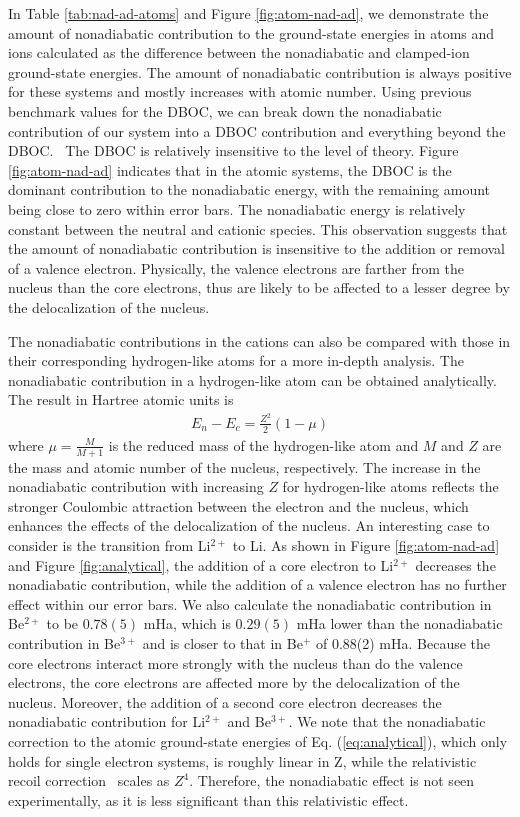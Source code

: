 In Table \ref{tab:nad-ad-atoms} and Figure \ref{fig:atom-nad-ad}, we demonstrate the amount of nonadiabatic contribution to the ground-state energies in atoms and ions calculated as the difference between the nonadiabatic and clamped-ion ground-state energies. The amount of nonadiabatic contribution is always positive for these systems and mostly increases with atomic number. Using previous benchmark values for the DBOC, we can break down the nonadiabatic contribution of our system into a DBOC contribution and everything beyond the DBOC.~\cite{Klopper_DBOC,CFOUR,Harding} The DBOC is relatively insensitive to the level of theory. Figure \ref{fig:atom-nad-ad} indicates that in the atomic systems, the DBOC is the dominant contribution to the nonadiabatic energy, with the remaining amount being close to zero within error bars. The nonadiabatic energy is relatively constant between the neutral and cationic species. This observation suggests that the amount of nonadiabatic contribution is insensitive to the addition or removal of a valence electron. Physically, the valence electrons are farther from the nucleus than the core electrons, thus are likely to be affected to a lesser degree by the delocalization of the nucleus. 

The nonadiabatic contributions in the cations can also be compared with those in their corresponding hydrogen-like atoms for a more in-depth analysis. The nonadiabatic contribution in a hydrogen-like atom can be obtained analytically. The result in Hartree atomic units is
\begin{align}
E_n-E_c=\frac{Z^2}{2}(1-\mu) \label{eq:analytical}
\end{align}
where $\mu=\frac{M}{M+1}$ is the reduced mass of the hydrogen-like atom and $M$ and $Z$ are the mass and atomic number of the nucleus, respectively. The increase in the nonadiabatic contribution with increasing $Z$ for hydrogen-like atoms reflects the stronger Coulombic attraction between the electron and the nucleus, which enhances the effects of the delocalization of the nucleus. An interesting case to consider is the transition from Li$^{2+}$ to Li. As shown in Figure \ref{fig:atom-nad-ad} and Figure \ref{fig:analytical}, the addition of a core electron to Li$^{2+}$ decreases the nonadiabatic contribution, while the addition of a valence electron has no further effect within our error bars. We also calculate the nonadiabatic contribution in Be$^{2+}$ to be $0.78(5)$ mHa, which is $0.29(5)$ mHa lower than the nonadiabatic contribution in Be$^{3+}$ and is closer to that in Be$^{+}$ of 0.88(2) mHa. Because the core electrons interact more strongly with the nucleus than do the valence electrons, the core electrons are affected more by the delocalization of the nucleus. Moreover, the addition of a second core electron decreases the nonadiabatic contribution for Li$^{2+}$ and Be$^{3+}$. %
We note that the nonadiabatic correction to the atomic ground-state energies of Eq. (\ref{eq:analytical}), which only holds for single electron systems, is roughly linear in Z, while the relativistic recoil correction~\cite{Merkt_H2} scales as $Z^4$. Therefore, the nonadiabatic effect is not seen experimentally,  as it is less significant than this relativistic effect.

